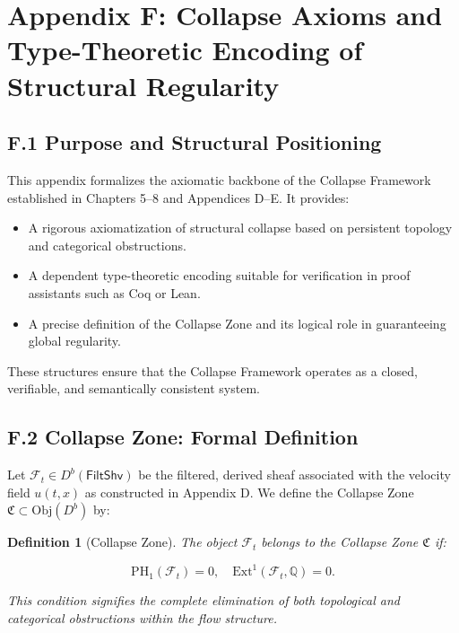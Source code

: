 \documentclass[11pt]{article}
\newtheorem{definition}[theorem]{Definition}
\begin{document}
\section*{Appendix F: Collapse Axioms and Type-Theoretic Encoding of Structural Regularity}

\subsection*{F.1 Purpose and Structural Positioning}

This appendix formalizes the axiomatic backbone of the Collapse Framework established in Chapters 5–8 and Appendices D–E.  
It provides:

\begin{itemize}
  \item A rigorous axiomatization of structural collapse based on persistent topology and categorical obstructions.
  \item A dependent type-theoretic encoding suitable for verification in proof assistants such as Coq or Lean.
  \item A precise definition of the Collapse Zone and its logical role in guaranteeing global regularity.
\end{itemize}

These structures ensure that the Collapse Framework operates as a closed, verifiable, and semantically consistent system.

\subsection*{F.2 Collapse Zone: Formal Definition}

Let \( \mathcal{F}_t \in D^b(\mathsf{FiltShv}) \) be the filtered, derived sheaf associated with the velocity field \( u(t, x) \) as constructed in Appendix D.  
We define the Collapse Zone \( \mathfrak{C} \subset \mathrm{Obj}(D^b) \) by:

\begin{definition}[Collapse Zone]
The object \( \mathcal{F}_t \) belongs to the Collapse Zone \( \mathfrak{C} \) if:

\[
\mathrm{PH}_1(\mathcal{F}_t) = 0, \quad \mathrm{Ext}^1(\mathcal{F}_t, \mathbb{Q}) = 0.
\]

This condition signifies the complete elimination of both topological and categorical obstructions within the flow structure.
\end{definition}
\end{document}
